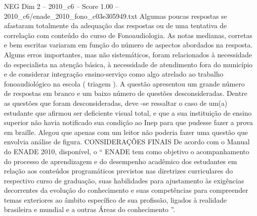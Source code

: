 \begin{textsample}{NEG Dim 2 – 2010\_c6 – Score 1.00 – 2010\_c6/enade\_2010\_fono\_c03e305949.txt}
Algumas poucas respostas se afastaram totalmente da adequação das respostas ou de uma tentativa de correlação com conteúdo do curso de Fonoaudiologia.
As notas medianas, corretas e bem escritas variaram em função do número de aspectos abordados na resposta.
Alguns erros importantes, mas não sistemáticos, foram relacionados à necessidade do especialista na atenção básica, à necessidade de atendimento fora do município e de considerar integração ensino-serviço como algo atrelado ao trabalho fonoaudiológico na escola ( triagem ).
A questão apresentou um grande número de respostas em branco e um baixo número de questões desconsideradas.
Dentre as questões que foram desconsideradas, deve -se ressaltar o caso de um(a) estudante que afirmou ser deficiente visual total, e que a sua instituição de ensino superior não havia notificado sua condição ao Inep para que pudesse fazer a prova em braille.
Alegou que apenas com um leitor não poderia fazer uma questão que envolvia análise de figura.
CONSIDERAÇÕES FINAIS De acordo com o Manual do ENADE 2010, disponível, o “ ENADE tem como objetivo o acompanhamento do processo de aprendizagem e do desempenho acadêmico dos estudantes em relação aos conteúdos programáticos previstos nas diretrizes curriculares do respectivo curso de graduação, suas habilidades para ajustamento às exigências decorrentes da evolução do conhecimento e suas competências para compreender temas exteriores ao âmbito específico de sua profissão, ligados à realidade brasileira e mundial e a outras Áreas do conhecimento ”.

\end{textsample}
